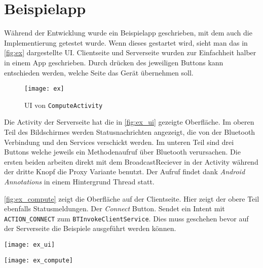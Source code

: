 \chapter{Beispielapp}\label{chap:example}
%
Während der Entwicklung wurde ein Beispielapp geschrieben, mit dem auch die Implementierung getestet wurde. Wenn dieses gestartet wird, sieht man das in \autoref{fig:ex} dargestellte UI. Clientseite und Serverseite wurden zur Einfachheit halber in einem App geschrieben. Durch drücken des jeweiligen Buttons kann entschieden werden, welche Seite das Gerät übernehmen soll.
\begin{figure}[htbp]
  \centering
  \texttt{[image: ex]}
  \caption{UI von \lstinline{ComputeActivity}}
  \label{fig:ex}
\end{figure}

Die Activity der Serverseite hat die in \autoref{fig:ex_ui} gezeigte Oberfläche. Im oberen Teil des Bildschirmes werden Statusnachrichten angezeigt, die von der Bluetooth Verbindung und den Services verschickt werden. Im unteren Teil sind drei Buttons welche jeweils ein Methodenaufruf über Bluetooth verursachen. Die ersten beiden arbeiten direkt mit dem BroadcastReciever in der Activity während der dritte Knopf die Proxy Variante benutzt. Der Aufruf findet dank \emph{Android Annotations} in einem Hintergrund Thread statt.

\autoref{fig:ex_compute} zeigt die Oberfläche auf der Clientseite. Hier zeigt der obere Teil ebenfalls Statusmeldungen. Der \emph{Connect} Button. Sendet ein Intent mit \lstinline{ACTION_CONNECT} zum \lstinline{BTInvokeClientService}. Dies muss geschehen bevor auf der Serverseite die Beispiele ausgeführt werden können.
%

\begin{minipage}{.5\textwidth}
    \centering
    \texttt{[image: ex\_ui]}
    \label{fig:ex_ui}
\end{minipage}
\begin{minipage}{.5\textwidth}
    \centering
    \texttt{[image: ex\_compute]}
    \label{fig:ex_compute}
\end{minipage}
%
